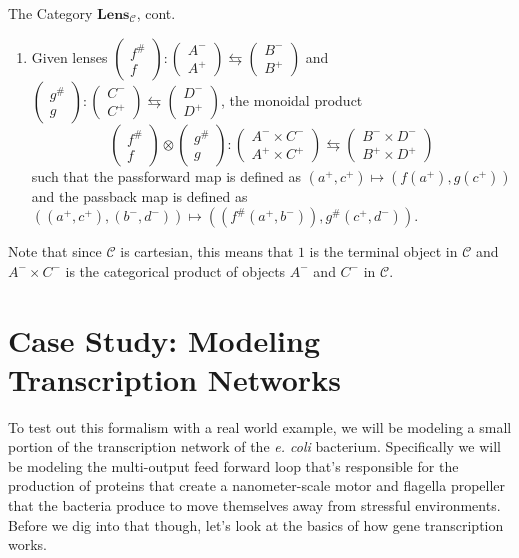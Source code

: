 \documentclass[12pt]{article}
\newcounter{examp}
\begin{document}
\begin{definition*}{The Category $\textbf{Lens}_\mathcal{C}$, cont.}{}
\begin{enumerate}
        \item Given lenses $\begin{pmatrix}f^{\#}\\f\end{pmatrix}:\begin{pmatrix}A^-\\A^+\end{pmatrix}\leftrightarrows\begin{pmatrix}B^-\\B^+\end{pmatrix}$
              and $\begin{pmatrix}g^{\#}\\g\end{pmatrix}:\begin{pmatrix}C^-\\C^+\end{pmatrix}\leftrightarrows\begin{pmatrix}D^-\\D^+\end{pmatrix}$, the monoidal product
              $$\begin{pmatrix}f^{\#}\\f\end{pmatrix} \otimes \begin{pmatrix}g^{\#}\\g\end{pmatrix}:\begin{pmatrix}A^- \times C^-\\A^+ \times C^+\end{pmatrix}\leftrightarrows\begin{pmatrix}B^- \times D^-\\B^+ \times D^+\end{pmatrix}$$
              such that the passforward map is defined as $(a^+, c^+) \mapsto (f(a^+), g(c^+))$ and the passback map is defined as $((a^+, c^+), (b^-, d^-)) \mapsto ((f^\#(a^+, b^-)), g^\#(c^+, d^-))$.
    \end{enumerate}

    Note that since $\mathcal{C}$ is cartesian, this means that $1$ is the terminal object in $\mathcal{C}$ and $A^- \times C^-$ is the categorical product of objects $A^-$ and $C^-$ in $\mathcal{C}$.
\end{definition*}





\section*{Case Study: Modeling Transcription Networks}
To test out this formalism with a real world example, we will be modeling a small portion of the transcription network of the \textit{e. coli} bacterium.
Specifically we will be modeling the multi-output feed forward loop that's responsible for the production of proteins that create a nanometer-scale motor and flagella propeller that the bacteria produce to move themselves away from stressful environments.
Before we dig into that though, let's look at the basics of how gene transcription works.
\end{document}
